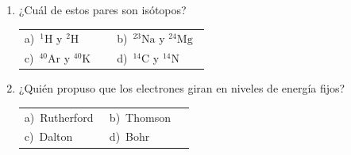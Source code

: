 \documentclass[11pt,a4paper]{article}
\begin{document}
\begin{enumerate}[label=\textbf{\arabic*.},leftmargin=*,itemsep=11pt,topsep=0pt]
\item \begin{minipage}[t]{\linewidth}
¿Cuál de estos pares son isótopos?

\vspace{5pt}
\begin{tabular}{@{}p{0.47\linewidth}p{0.47\linewidth}@{}}
a)~${}^{1}\mathrm{H}$ y ${}^{2}\mathrm{H}$ & b)~${}^{23}\mathrm{Na}$ y ${}^{24}\mathrm{Mg}$ \\
c)~${}^{40}\mathrm{Ar}$ y ${}^{40}\mathrm{K}$ & d)~${}^{14}\mathrm{C}$ y ${}^{14}\mathrm{N}$ \\
\end{tabular}
\end{minipage}

\item \begin{minipage}[t]{\linewidth}
¿Quién propuso que los electrones giran en niveles de energía fijos?

\vspace{5pt}
\begin{tabular}{@{}p{0.47\linewidth}p{0.47\linewidth}@{}}
a)~Rutherford & b)~Thomson \\
c)~Dalton & d)~Bohr \\
\end{tabular}
\end{minipage}

\end{enumerate}
\end{document}
